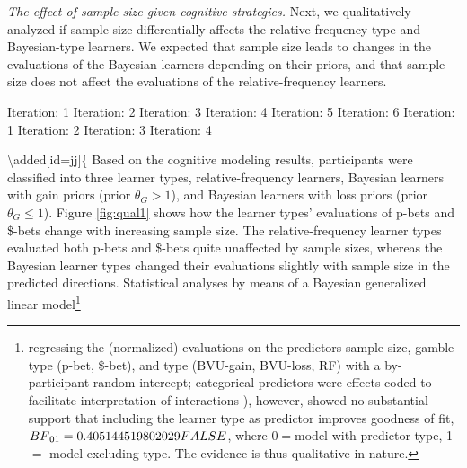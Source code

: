 \documentclass[a4paper, man, floatsintext]{apa6}
\let\rmarkdownfootnote\footnote%
\def\footnote{\protect\rmarkdownfootnote}
\begin{document}
\emph{The effect of sample size given cognitive strategies.} Next, we
qualitatively analyzed if sample size differentially affects the
relative-frequency-type and Bayesian-type learners. We expected that
sample size leads to changes in the evaluations of the Bayesian learners
depending on their priors, and that sample size does not affect the
evaluations of the relative-frequency learners. 

Iteration: 1 Iteration: 2 Iteration: 3 Iteration: 4 Iteration: 5
Iteration: 6 Iteration: 1 Iteration: 2 Iteration: 3 Iteration: 4

\textbackslash{}added{[}id=jj{]}\{ Based on the cognitive modeling
results, participants were classified into three learner types,
relative-frequency learners, Bayesian learners with gain priors (prior
\(\theta_G > 1\)), and Bayesian learners with loss priors (prior
\(\theta_G \leq 1\)). Figure \ref{fig:qual1} shows how the learner
types' evaluations of p-bets and \$-bets change with increasing sample
size. The relative-frequency learner types evaluated both p-bets and
\$-bets quite unaffected by sample sizes, whereas the Bayesian learner
types changed their evaluations slightly with sample size in the
predicted directions. Statistical analyses by means of a Bayesian
generalized linear
model\footnote{regressing the (normalized) evaluations on the predictors sample size, gamble type (p-bet, \$-bet), and type (BVU-gain, BVU-loss, RF) with a by-participant random intercept; categorical predictors were effects-coded to facilitate interpretation of interactions \citep[for details, see][]{SingmannForthcoming}), however, showed no substantial support that including the learner type as predictor improves goodness of fit, $BF\textsubscript{01}=0.405144519802029FALSE$, where $0=$model with predictor type, 1$=$ model excluding type. The evidence is thus qualitative in nature.}
\end{document}
